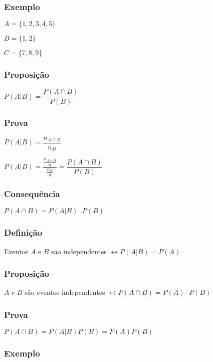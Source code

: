 \documentclass[a4paper]{article}
\begin{document}
	\subsubsection{Exemplo}
	
	$A = \{1,2,3,4,5\}$
	
	$B = \{1,2\}$
	
	$C = \{7,8,9\}$
	
	\subsubsection{Proposição}
	
	$P(A|B) = \dfrac{P(A \cap B)}{P(B)}$
	
	\subsubsection{Prova}
	
	$P(A|B) = \dfrac{n_{A \cap B}}{n_B}$
	
	$P(A|B) = \dfrac{\frac{n_{A \cap B}}{n}}{\frac{n_B}{n}} = \dfrac{P(A \cap B)}{P(B)}$
	
	\subsubsection{Consequência}
	
	$P(A \cap B) = P(A|B) \cdot P(B)$
	
	\subsubsection{Definição}
	
	Eventos $A$ e $B$ são independentes \hspace{5mm} $\leftrightarrow P(A|B) = P(A)$
	
	\subsubsection{Proposição}
	
	$A$ e $B$ são eventos independentes \hspace{5mm} $\leftrightarrow P(A \cap B) = P(A) \cdot P(B)$
	
	\subsubsection{Prova}
	
	$P(A \cap B) = P(A|B)P(B) = P(A)P(B)$
	
	\subsubsection{Exemplo}
	
\end{document}
